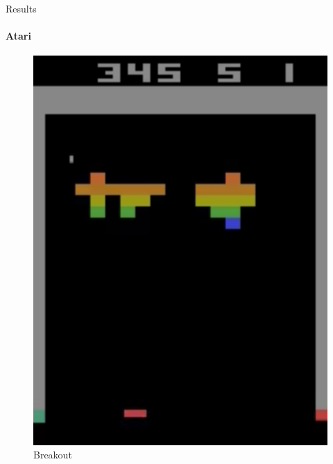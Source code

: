 \documentclass{beamer}
\begin{document}
\begin{frame}{Results}
\framesubtitle{Atari}

\begin{minipage}[t]{\textwidth}
    \begin{minipage}{0.3\textwidth}
    \begin{figure}
    \includegraphics[height=0.35\textheight]{img/Breakout}
    \caption*{Breakout}
    \end{figure}
    \end{minipage}
    \hfill
    \begin{minipage}{0.3\textwidth}
    \begin{figure}

\end{figure}
\end{minipage}
\end{minipage}
\end{frame}
\end{document}
